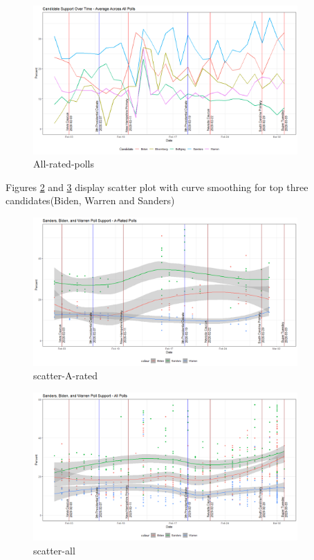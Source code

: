 \begin{figure}[H]
    \centering
    \includegraphics[width=0.9\textwidth]{figures/All-rated-polls.png}
    \caption{All-rated-polls}
    \label{All-rated-polls}
\end{figure}

Figures \ref{scatter-A-rated} and \ref{scatter-all} display scatter plot with curve smoothing for top three candidates(Biden, Warren and Sanders)
\begin{figure}[H]
    \centering
    \includegraphics[width=0.9\textwidth]{figures/scatter-A-rated.png}
    \caption{scatter-A-rated}
    \label{scatter-A-rated}
\end{figure}

\begin{figure}[H]
    \centering
    \includegraphics[width=0.9\textwidth]{figures/scatter-all.png}
    \caption{scatter-all}
    \label{scatter-all}
\end{figure}

